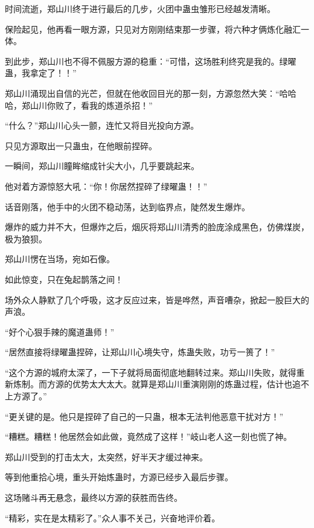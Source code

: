 
\begin{this_body}



时间流逝，郑山川终于进行最后的几步，火团中蛊虫雏形已经越发清晰。

保险起见，他再看一眼方源，只见对方刚刚结束那一步骤，将六种才俩炼化融汇一体。

到此步，郑山川也不得不佩服方源的稳重：“可惜，这场胜利终究是我的。绿曜蛊，我拿定了！！”

郑山川涌现出自信的光芒，但就在他收回目光的那一刻，方源忽然大笑：“哈哈哈，郑山川你败了，看我的炼道杀招！”

“什么？”郑山川心头一颤，连忙又将目光投向方源。

只见方源取出一只蛊虫，在他眼前捏碎。

一瞬间，郑山川瞳眸缩成针尖大小，几乎要跳起来。

他对着方源惊怒大吼：“你！你居然捏碎了绿曜蛊！！”

话音刚落，他手中的火团不稳动荡，达到临界点，陡然发生爆炸。

爆炸的威力并不大，但爆炸之后，烟灰将郑山川清秀的脸庞涂成黑色，仿佛煤炭，极为狼狈。

郑山川愣在当场，宛如石像。

如此惊变，只在兔起鹊落之间！

场外众人静默了几个呼吸，这才反应过来，皆是哗然，声音嘈杂，掀起一股巨大的声浪。

“好个心狠手辣的魔道蛊师！”

“居然直接将绿曜蛊捏碎，让郑山川心境失守，炼蛊失败，功亏一篑了！”

“这个方源的城府太深了，一下子就将局面彻底地翻转过来。郑山川失败，就得重新炼制。而方源的优势太大太大。就算是郑山川重演刚刚的炼蛊过程，估计也追不上方源了。”

“更关键的是。他只是捏碎了自己的一只蛊，根本无法判他恶意干扰对方！”

“糟糕。糟糕！他居然会如此做，竟然成了这样！”岐山老人这一刻也慌了神。

郑山川受到的打击太大，太突然，好半天才缓过神来。

等到他重拾心境，重头开始炼蛊时，方源已经步入最后步骤。

这场赌斗再无悬念，最终以方源的获胜而告终。

“精彩，实在是太精彩了。”众人事不关己，兴奋地评价着。


\end{this_body}
